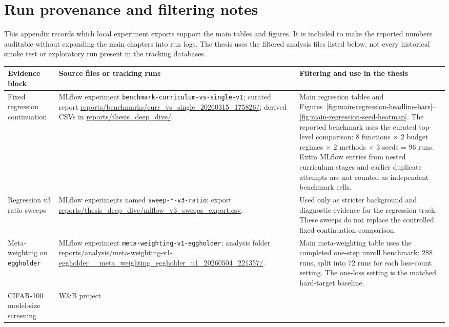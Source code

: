 \chapter{Run provenance and filtering notes}
\label{app:run-provenance}

This appendix records which local experiment exports support the main tables and
figures. It is included to make the reported numbers auditable without expanding
the main chapters into run logs. The thesis uses the filtered analysis files
listed below, not every historical smoke test or exploratory run present in the
tracking databases.

\begin{table}[htbp]
\centering
\scriptsize
\setlength{\tabcolsep}{3pt}
\begin{tabularx}{\textwidth}{@{}>{\raggedright\arraybackslash}p{}>{\raggedright\arraybackslash}X>{\raggedright\arraybackslash}X@{}}
\toprule
Evidence block & Source files or tracking runs & Filtering and use in the thesis \\
\midrule
Fixed regression continuation & MLflow experiment
\texttt{benchmark-curriculum-vs-single-v1}; curated report
\url{reports/benchmarks/curr_vs_single_20260315_175826/}; derived CSVs in
\url{reports/thesis_deep_dive/}. & Main regression tables and
Figures~\ref{fig:main-regression-headline-bars}--\ref{fig:main-regression-seed-heatmap}.
The reported benchmark uses the curated top-level comparison: 8 functions
$\times$ 2 budget regimes $\times$ 2 methods $\times$ 3 seeds = 96 runs. Extra
MLflow entries from nested curriculum stages and earlier duplicate attempts are
not counted as independent benchmark cells. \\
\addlinespace
Regression v3 ratio sweeps & MLflow experiments named
\texttt{sweep-*-v3-ratio}; export
\url{reports/thesis_deep_dive/mlflow_v3_sweeps_export.csv}. & Used only as
stricter background and diagnostic evidence for the regression track. These
sweeps do not replace the controlled fixed-continuation comparison. \\
\addlinespace
Meta-weighting on \texttt{eggholder} & MLflow experiment
\texttt{meta-weighting-v1-eggholder}; analysis folder
\url{reports/analysis/meta-weighting-v1-eggholder__meta_weighting_eggholder_u1_20260504_221357/}.
& Main meta-weighting table uses the completed one-step unroll benchmark: 288
runs, split into 72 runs for each loss-count setting. The one-loss setting is
the matched hard-target baseline. \\
\addlinespace
CIFAR-100 model-size screening & W\&B project

\end{tabularx}
\end{table}
